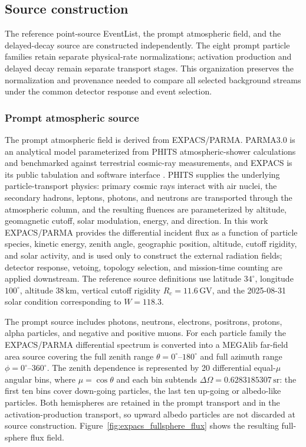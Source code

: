 \documentclass[11pt]{article}
\newcommand{\revblue}[1]{\textcolor{revisionblue}{#1}}
\begin{document}
\subsection{Source construction}
\label{sec:background}

The reference point-source EventList, the prompt atmospheric field, and the
delayed-decay source are constructed independently. \revblue{The eight prompt
particle families retain separate physical-rate normalizations}; activation production and delayed
decay remain separate transport stages. This organization preserves the
normalization and provenance needed to compare all selected background streams
under the common detector response and event selection.

\subsubsection{Prompt atmospheric source}
\label{subsec:prompt_source}

The prompt atmospheric field is derived from EXPACS/PARMA. PARMA3.0 is an
analytical model parameterized from PHITS atmospheric-shower calculations and
benchmarked against terrestrial cosmic-ray measurements, and EXPACS is its
public tabulation and software interface
\cite{Sato2015EXPACS,Sato2016PARMA4}. PHITS supplies the underlying
particle-transport physics: primary cosmic rays interact with air nuclei, the
secondary hadrons, leptons, photons, and neutrons are transported through the
atmospheric column, and the resulting fluences are parameterized by altitude,
geomagnetic cutoff, solar modulation, energy, and direction. In this work
EXPACS/PARMA provides the differential incident flux as a function of particle
species, kinetic energy, zenith angle, geographic position, altitude, cutoff
rigidity, and solar activity, and is used only to construct the external
radiation fields; detector response, vetoing, topology selection, and
mission-time counting are applied downstream. The reference source definitions
use latitude $34^\circ$, longitude $100^\circ$, altitude $38\,\mathrm{km}$,
vertical cutoff rigidity $R_c=11.6\,\mathrm{GV}$, and the 2025-08-31 solar
condition corresponding to $W=118.3$.

The prompt source includes photons, neutrons, electrons, positrons, protons,
alpha particles, and negative and positive muons. For each particle family the
EXPACS/PARMA differential spectrum is converted into a MEGAlib far-field area
source covering the full zenith range $\theta=0^\circ$--$180^\circ$ and full
azimuth range $\phi=0^\circ$--$360^\circ$. The zenith dependence is represented
by 20 differential equal-$\mu$ angular bins, where $\mu=\cos\theta$ and each
bin subtends $\Delta\Omega=0.6283185307\,\mathrm{sr}$: the first ten bins cover
down-going particles, the last ten up-going or albedo-like particles. Both
hemispheres are retained in the prompt transport and in the
activation-production transport, so upward albedo particles are not discarded
at source construction. Figure~\ref{fig:expacs_fullsphere_flux} shows the
resulting full-sphere flux field.
\end{document}
